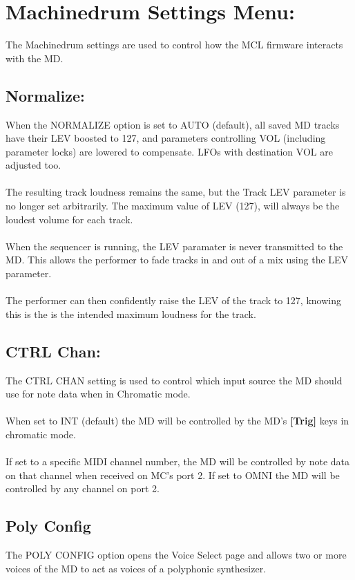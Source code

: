 \chapter{Machinedrum Settings Menu:}
The Machinedrum settings are used to control how the MCL firmware interacts with the MD.
\section{Normalize:}

When the NORMALIZE option is set to AUTO (default), all saved MD tracks have their LEV boosted to 127, and parameters controlling VOL (including parameter locks) are lowered
to compensate. LFOs with destination VOL are 
adjusted too.\\
\\
The resulting track loudness remains the same, but the Track LEV parameter is no longer set arbitrarily. The maximum value of LEV (127), will always be the loudest volume for each track.\\
\\
When the sequencer is running, the LEV paramater is never transmitted to the MD. This allows the performer to fade tracks in and out of a mix using the LEV parameter.\\
\\
The performer can then confidently raise the LEV of the track to 127, knowing this is the is the intended maximum loudness for the track.
\section{CTRL Chan:}
The CTRL CHAN setting is used to control which input source the MD should use for note data when in Chromatic mode.
\\\\
When set to INT (default) the MD will be controlled by the MD's \textbf{[Trig]} keys in chromatic mode.
\\\\
If set to a specific MIDI channel number, the MD will be controlled by note data on that channel when received on MC's port 2. If set to OMNI the MD will be controlled by any channel on port 2.
\section{Poly Config}
The POLY CONFIG option opens the Voice Select page and allows two or more voices of the MD to act as voices of a polyphonic synthesizer.